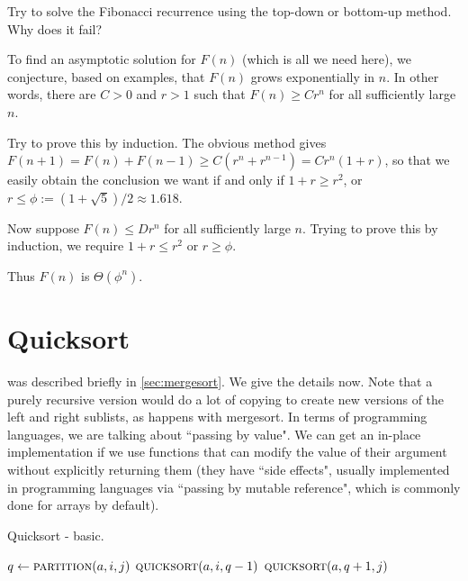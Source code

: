 \begin{Boxample}[3]
Try to solve the Fibonacci recurrence using the top-down or bottom-up method. Why does it fail?

\end{Boxample}

To find an asymptotic solution for $F(n)$ (which is all we need here), we conjecture, based on examples, 
that $F(n)$ grows exponentially in $n$. 
In other words, there are $C > 0$ and $r > 1$ such that 
$F(n) \geq C r^n$ for all sufficiently large $n$.

Try to prove this by induction. The obvious method gives 
$F(n+1) = F(n) + F(n-1) \geq C(r^n + r^{n-1}) = Cr^{n}(1+r)$, so that we easily obtain
the conclusion we want if and only if $1 + r \geq r^2$, or $r \leq
\phi:= (1 + \sqrt{5})/2 \approx 1.618$. 

Now suppose $F(n) \leq D r^n$ for all sufficiently large $n$. 
Trying to prove this by induction, we require $1 + r \leq r^2$ or $r \geq \phi$. 

Thus $F(n)$ is $\Theta(\phi^n)$.


\chapter{Quicksort} %
\label{sec:quicksort}

 was described briefly in \cref{sec:mergesort}. We give the details now. Note that a purely recursive version would do a lot of copying to 
create new versions of the left and right sublists, as happens with mergesort. In terms of programming languages, we are talking about ``passing by value". 
We can get an in-place implementation if we use functions that can modify the value of their argument without explicitly returning them 
(they have ``side effects", usually implemented in programming languages via ``passing by mutable reference", which is commonly done for arrays by default).

\begin{algorithm}[H]
  \caption{Quicksort - basic.}    
  \label{alg:quicksort}
\begin{algorithmic}[0]
		        \State $q \gets  \Call{partition}{a, i,j}$ 
			\State $\Call{quicksort}{a,i,q-1}$ 
			\State $\Call{quicksort}{a,q+1,j}$ 
		\EndIf
	\EndFunction  
\end{algorithmic}
\end{algorithm}

